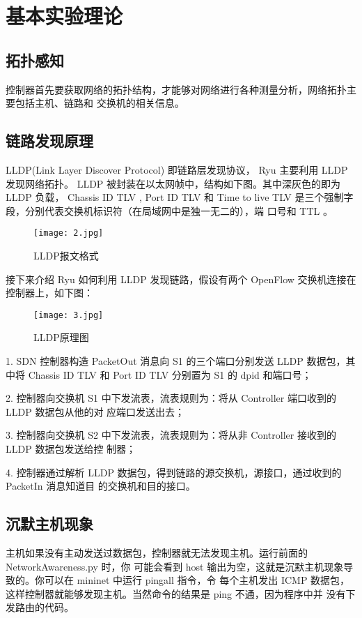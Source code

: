 \documentclass{xjtureport}
\begin{document}
\section{基本实验理论}
\subsection{拓扑感知}
控制器首先要获取网络的拓扑结构，才能够对网络进行各种测量分析，网络拓扑主要包括主机、链路和
交换机的相关信息。
\subsection{链路发现原理}
LLDP(Link Layer Discover Protocol) 即链路层发现协议， Ryu 主要利用 LLDP 发现网络拓扑。
LLDP 被封装在以太网帧中，结构如下图。其中深灰色的即为 LLDP 负载， Chassis ID TLV , Port ID
TLV 和 Time to live TLV 是三个强制字段，分别代表交换机标识符（在局域网中是独一无二的），端
口号和 TTL 。
\begin{figure}[H]
	\centering
	\texttt{[image: 2.jpg]}
	\caption{LLDP报文格式}
\end{figure}
接下来介绍 Ryu 如何利用 LLDP 发现链路，假设有两个 OpenFlow 交换机连接在控制器上，如下图：
\begin{figure}[H]
	\centering
	\texttt{[image: 3.jpg]}
	\caption{LLDP原理图}
\end{figure}
1. SDN 控制器构造 PacketOut 消息向 S1 的三个端口分别发送 LLDP 数据包，其中将 Chassis ID
TLV 和 Port ID TLV 分别置为 S1 的 dpid 和端口号；\par
2. 控制器向交换机 S1 中下发流表，流表规则为：将从 Controller 端口收到的 LLDP 数据包从他的对
应端口发送出去；\par
3. 控制器向交换机 S2 中下发流表，流表规则为：将从非 Controller 接收到的 LLDP 数据包发送给控
制器；\par
4. 控制器通过解析 LLDP 数据包，得到链路的源交换机，源接口，通过收到的 PacketIn 消息知道目
的交换机和目的接口。
\subsection{沉默主机现象}
主机如果没有主动发送过数据包，控制器就无法发现主机。运行前面的 NetworkAwareness.py 时，你
可能会看到 host 输出为空，这就是沉默主机现象导致的。你可以在 mininet 中运行 pingall 指令，令
每个主机发出 ICMP 数据包，这样控制器就能够发现主机。当然命令的结果是 ping 不通，因为程序中并
没有下发路由的代码。
\end{document}
